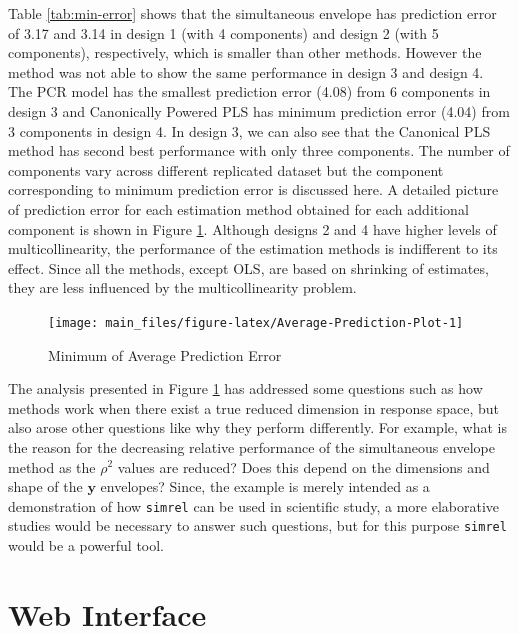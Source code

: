 \documentclass[review]{elsarticle}
\theoremstyle{definition}
\theoremstyle{definition}
\theoremstyle{remark}
\begin{document}

Table \ref{tab:min-error} shows that the simultaneous envelope has
prediction error of 3.17 and 3.14 in design 1 (with 4 components) and
design 2 (with 5 components), respectively, which is smaller than other
methods. However the method was not able to show the same performance in
design 3 and design 4. The PCR model has the smallest prediction error
(4.08) from 6 components in design 3 and Canonically Powered PLS has
minimum prediction error (4.04) from 3 components in design 4. In design
3, we can also see that the Canonical PLS method has second best
performance with only three components. The number of components vary
across different replicated dataset but the component corresponding to
minimum prediction error is discussed here. A detailed picture of
prediction error for each estimation method obtained for each additional
component is shown in Figure \ref{fig:Average-Prediction-Plot}. Although
designs 2 and 4 have higher levels of multicollinearity, the performance
of the estimation methods is indifferent to its effect. Since all the
methods, except OLS, are based on shrinking of estimates, they are less
influenced by the multicollinearity problem.

\begin{figure}[!htb]
\texttt{[image: main\_files/figure-latex/Average-Prediction-Plot-1]} \caption{Minimum of Average Prediction Error}\label{fig:Average-Prediction-Plot}
\end{figure}

The analysis presented in Figure \ref{fig:Average-Prediction-Plot} has
addressed some questions such as how methods work when there exist a
true reduced dimension in response space, but also arose other questions
like why they perform differently. For example, what is the reason for
the decreasing relative performance of the simultaneous envelope method
as the \(\rho^2\) values are reduced? Does this depend on the dimensions
and shape of the \(\mathbf{y}\) envelopes? Since, the example is merely
intended as a demonstration of how \texttt{simrel} can be used in
scientific study, a more elaborative studies would be necessary to
answer such questions, but for this purpose \texttt{simrel} would be a
powerful tool.

\section{Web Interface}\label{web-interface}
\end{document}
